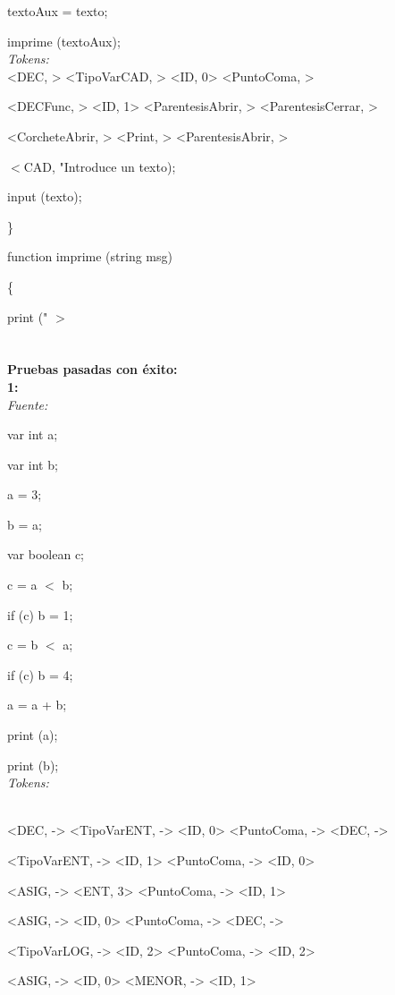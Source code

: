 \documentclass{article}
\begin{document}
textoAux = texto;

imprime (textoAux);\medskip\\
\emph{Tokens:}\\

\< \>
 <DEC, > 
 <TipoVarCAD, > 
 <ID, 0> 
 <PuntoComa, > 
 
 \< \> 
 <DECFunc, > 
 <ID, 1> 
 <ParentesisAbrir, > 
 <ParentesisCerrar, > 
 
 \< \> 
 <CorcheteAbrir, > 
 <Print, > 
 <ParentesisAbrir, > 
 
$<$CAD, "\textnormal{Introduce un texto);} 
 
	input (texto);
	
\} 

\textnormal{function imprime (string msg)}

\{ 

	print (" $>$
	\< \>
 \\<ID, 2> 
 \\<ID, 3> \bigskip \\
\textbf{Pruebas pasadas con éxito:}\medskip\\
\textbf{1:}\smallskip\\
\emph{Fuente:} \smallskip


var int a;
 
var int b;

a = 3;

b = a;

 var boolean c;
 
c = a  $<$  b;

if (c) b  =  1;

c = b  $<$  a;

if (c) b  =  4;

 a = a  +  b;
 
print (a);

print (b);\medskip \\
\emph{Tokens:}

\smallskip 
\\
\< \> 
 <DEC, -> 
 <TipoVarENT, -> 
 <ID, 0> 
 <PuntoComa, -> 
 <DEC, ->
 
 \< \> 
 <TipoVarENT, -> 
 <ID, 1> 
 <PuntoComa, -> 
 <ID, 0> 
 
 \< \> 
 <ASIG, -> 
 <ENT, 3> 
 <PuntoComa, -> 
 <ID, 1> 
 
 \< \> 
 <ASIG, -> 
 <ID, 0> 
 <PuntoComa, -> 
 <DEC, -> 
 
 \< \> 
 <TipoVarLOG, -> 
 <ID, 2> 
 <PuntoComa, -> 
 <ID, 2> 
 
 \< \> 
 <ASIG, -> 
 <ID, 0> 
 <MENOR, -> 
 <ID, 1> 
 
\end{document}
